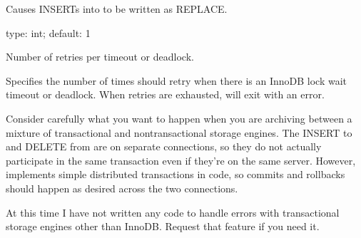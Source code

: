 \documentclass[letterpaper,10pt,english]{sphinxmanual}
\begin{document}
\begin{fulllineitems}
\label{\detokenize{mariadb-archiver:cmdoption-mariadb-archiver-replace}}
\sphinxAtStartPar
Causes INSERTs into {\hyperref[\detokenize{mariadb-archiver:cmdoption-mariadb-archiver-dest}]{}} to be written as REPLACE.

\end{fulllineitems}


\begin{fulllineitems}
\label{\detokenize{mariadb-archiver:cmdoption-mariadb-archiver-retries}}
\sphinxAtStartPar
type: int; default: 1

\sphinxAtStartPar
Number of retries per timeout or deadlock.

\sphinxAtStartPar
Specifies the number of times  should retry when there is an
InnoDB lock wait timeout or deadlock.  When retries are exhausted,
 will exit with an error.

\sphinxAtStartPar
Consider carefully what you want to happen when you are archiving between a
mixture of transactional and non\sphinxhyphen{}transactional storage engines.  The INSERT to
{\hyperref[\detokenize{mariadb-archiver:cmdoption-mariadb-archiver-dest}]{}} and DELETE from {\hyperref[\detokenize{mariadb-archiver:cmdoption-mariadb-archiver-source}]{}} are on separate connections, so they
do not actually participate in the same transaction even if they’re on the same
server.  However,  implements simple distributed transactions in
code, so commits and rollbacks should happen as desired across the two
connections.

\sphinxAtStartPar
At this time I have not written any code to handle errors with transactional
storage engines other than InnoDB.  Request that feature if you need it.

\end{fulllineitems}
\end{document}
